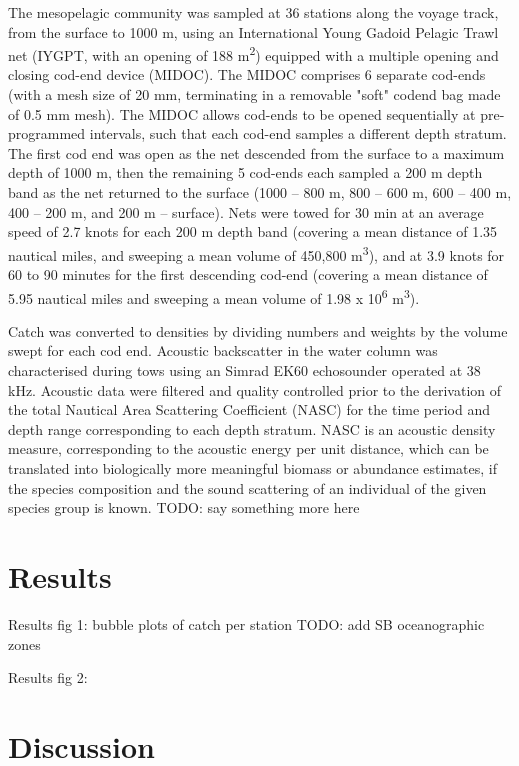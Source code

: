 \documentclass[12pt]{article}
\begin{document}
{The mesopelagic community was sampled at 36 stations along the voyage track, from the surface to 1000 m, using an International Young Gadoid Pelagic Trawl net (IYGPT, with an opening of 188 m\textsuperscript{2}) equipped with a multiple opening and closing cod-end device (MIDOC). 
The MIDOC comprises 6 separate cod-ends (with a mesh size of 20 mm, terminating in a removable "soft" codend bag made of 0.5 mm mesh). 
The MIDOC allows cod-ends to be opened sequentially at pre-programmed intervals, such that each cod-end samples a different depth stratum.
The first cod end was open as the net descended from the surface to a maximum depth of 1000 m, then the remaining 5 cod-ends each sampled a 200 m depth band as the net returned to the surface (1000 – 800 m, 800 – 600 m, 600 – 400 m, 400 – 200 m, and 200 m – surface).
Nets were towed for 30 min at an average speed of 2.7 knots for each 200 m depth band (covering a mean distance of 1.35 nautical miles, and sweeping a mean volume of 450,800 m\textsuperscript{3}), and at 3.9 knots for 60 to 90 minutes for the first descending cod-end (covering a mean distance of 5.95 nautical miles and sweeping a mean volume of 1.98 x 10\textsuperscript{6} m\textsuperscript{3}). 


Catch was converted to densities by dividing numbers and weights by the volume swept for each cod end. Acoustic backscatter in the water column was characterised during tows using an Simrad EK60 echosounder operated at 38 kHz.
Acoustic data were filtered and quality controlled prior to the derivation of the total Nautical Area Scattering Coefficient (NASC) for the time period and depth range corresponding to each depth stratum. NASC is an acoustic density measure, corresponding to the acoustic energy per unit distance, which can be translated into biologically more meaningful biomass or abundance estimates, if the species composition and the sound scattering of an individual of the given species group is known.
TODO: say something more here


\section{Results}

Results fig 1: bubble plots of catch per station
	TODO: add SB oceanographic zones

Results fig 2: 

\section{Discussion}

}
\end{document}
